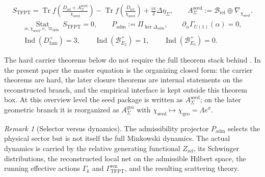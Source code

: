 \documentclass[11pt,a4paper]{article}
\theoremstyle{definition}
\theoremstyle{remark}
\newtheorem*{remark}{Remark}
\newcommand{\chiseed}{\chi_{\mathrm{seed}}}
\newcommand{\chigeo}{\chi_{\mathrm{geo}}}
\newcommand{\Padm}{P_{\mathrm{adm}}}
\newcommand{\wspin}{\varpi_{\mathrm{spin}}}
\begin{document}
\begin{tcolorbox}[colback=tfptblue!3, colframe=tfptblue, breakable,
    title={TFPT master equation and closed indices}, colbacktitle=tfptblue]
\begin{equation}
\label{eq:tfpt-master}
\begin{aligned}
S_{\mathrm{TFPT}}
=
\operatorname{Tr}f\!\left(\frac{D_{\mathrm{rel}}+A_{\Sigma}^{\mathrm{seed}}}{\chiseed}\right)
-
\operatorname{Tr}f\!\left(\frac{D_{\mathrm{ref}}}{\chiseed}\right)
+\frac{i\pi}{2}\Delta\eta_\Sigma,
\qquad
A_{\Sigma}^{\mathrm{seed}}:=\mathcal B_{\mathrm{rel}}\oplus\nabla_{\chiseed}.
\end{aligned}
\end{equation}
\begin{equation}
\label{eq:tfpt-selectors}
\begin{aligned}
\operatorname*{Stat}_{\alpha,\chiseed,e,\wspin}S_{\mathrm{TFPT}}=0,
\qquad
\Padm:=\Pi_{\ker\Delta_{\mathrm{adm}}},
\qquad
\partial_\alpha\Gamma_{U(1)}(\alpha)=0,
\\
\operatorname{Ind}(D^+_{\mathrm{fam}})=3,
\qquad
\operatorname{Ind}(\mathcal B^+_{E_2})=1,
\qquad
\operatorname{Ind}(\mathcal B^+_{E_3})=0.
\end{aligned}
\end{equation}
\end{tcolorbox}

The hard carrier theorems below do not require the full theorem stack behind
. In the present paper the master equation is the
organizing closed form: the carrier theorems are hard, the later closure theorems are internal
statements on the reconstructed branch, and the empirical interface is kept outside this theorem
box. At
this overview level the seed package is written as $A_{\Sigma}^{\mathrm{seed}}$; on the later
geometric branch it is reorganized as $A_{\Sigma}^{\mathrm{geo}}$ with
$\chiseed\mapsto\chigeo=\Lambda e^\sigma$.

\begin{remark}[Selector versus dynamics]
\label{rem:selector-versus-dynamics}
The admissibility projector $\Padm$ selects the physical sector but is not itself the full
Minkowski dynamics. The actual dynamics is carried by the relative generating functional
$Z_{\mathrm{rel}}$, its Schwinger distributions, the reconstructed local net on the admissible
Hilbert space, the running effective actions $\Gamma_k$ and
$\Gamma_{\mathrm{TFPT}}^{\mathrm{ren}}$, and the resulting scattering theory.
\end{remark}
\end{document}
